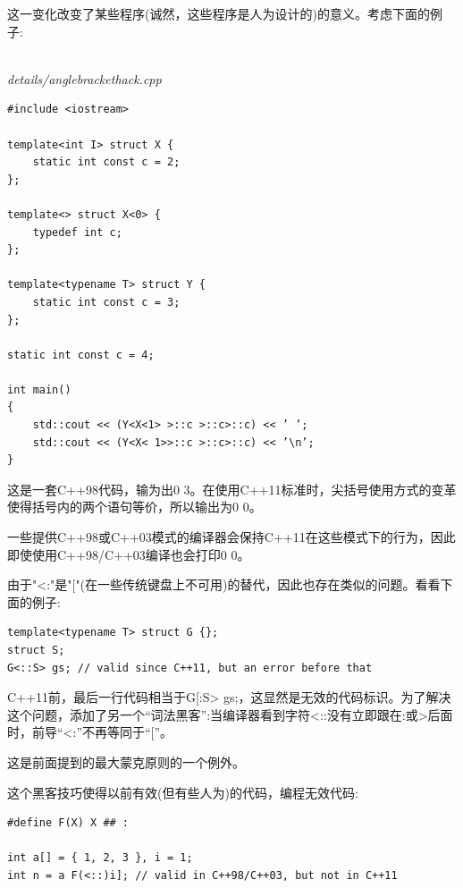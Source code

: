 这一变化改变了某些程序(诚然，这些程序是人为设计的)的意义。考虑下面的例子:

\hspace*{\fill} \\ %
\noindent
\textit{details/anglebrackethack.cpp}
\begin{lstlisting}[style=styleCXX]
#include <iostream>

template<int I> struct X {
	static int const c = 2;
};

template<> struct X<0> {
	typedef int c;
};

template<typename T> struct Y {
	static int const c = 3;
};

static int const c = 4;

int main()
{
	std::cout << (Y<X<1> >::c >::c>::c) << ’ ’;
	std::cout << (Y<X< 1>>::c >::c>::c) << ’\n’;
}
\end{lstlisting}

这是一套C++98代码，输为出0 3。在使用C++11标准时，尖括号使用方式的变革使得括号内的两个语句等价，所以输出为0 0。

\begin{tcolorbox}[colback=webgreen!5!white,colframe=webgreen!75!black]
\hspace*{0.75cm}一些提供C++98或C++03模式的编译器会保持C++11在这些模式下的行为，因此即使使用C++98/C++03编译也会打印0 0。
\end{tcolorbox}

由于"<:"是"["(在一些传统键盘上不可用)的替代，因此也存在类似的问题。看看下面的例子:

\begin{lstlisting}[style=styleCXX]
template<typename T> struct G {};
struct S;
G<::S> gs; // valid since C++11, but an error before that
\end{lstlisting}

C++11前，最后一行代码相当于G[:S> gs;，这显然是无效的代码标识。为了解决这个问题，添加了另一个“词法黑客”:当编译器看到字符<::没有立即跟在:或>后面时，前导“<:”不再等同于“[”。

\begin{tcolorbox}[colback=webgreen!5!white,colframe=webgreen!75!black]
\hspace*{0.75cm}这是前面提到的最大蒙克原则的一个例外。
\end{tcolorbox}

这个黑客技巧使得以前有效(但有些人为)的代码，编程无效代码:

\begin{lstlisting}[style=styleCXX]
#define F(X) X ## :

int a[] = { 1, 2, 3 }, i = 1;
int n = a F(<::)i]; // valid in C++98/C++03, but not in C++11
\end{lstlisting}

